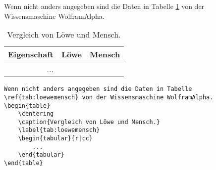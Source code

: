 \begin{frame}
	\Losung
	\begin{outputbox}
		Wenn nicht anders angegeben sind die Daten in Tabelle \ref{tab:loewemensch} von der Wissensmaschine WolframAlpha.
		\vspace{-0.5cm}
		\begin{table}
			\centering
			\caption{Vergleich von Löwe und Mensch.}
			\label{tab:loewemensch}
			\vspace{-0.2cm}
			\begin{tabular}{r|cc}
				\hline
				\textbf{Eigenschaft}														&	\textbf{Löwe}	& \textbf{Mensch} \\\hline
				... &&
			\end{tabular}
		\end{table}
	\end{outputbox}
	
	\Code
	\begin{lstlisting}
Wenn nicht anders angegeben sind die Daten in Tabelle \ref{tab:loewemensch} von der Wissensmaschine WolframAlpha.	
\begin{table}
	\centering
	\caption{Vergleich von Löwe und Mensch.}
	\label{tab:loewemensch}
	\begin{tabular}{r|cc}
		...
	\end{tabular}
\end{table}
	\end{lstlisting}
\end{frame}